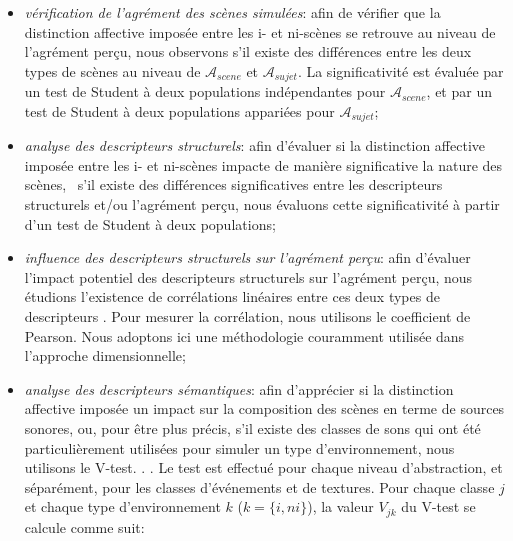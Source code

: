 \documentclass[twoside,twocolumn]{article}
\begin{document}
\begin{itemize}
\item \emph{vérification de l'agrément des scènes simulées}: afin de vérifier que la distinction affective imposée entre les i- et ni-scènes se retrouve au niveau de l'agrément perçu, nous observons s'il existe des différences entre les deux types de scènes au niveau de $\mathcal{A}_{scene}$ et $\mathcal{A}_{sujet}$. La significativité est évaluée par un test de Student à deux populations indépendantes pour $\mathcal{A}_{scene}$, et par un test de Student à deux populations appariées pour $\mathcal{A}_{sujet}$;
\item \emph{analyse des descripteurs structurels}: afin d'évaluer si la distinction affective imposée entre les i- et ni-scènes impacte de manière significative la nature des scènes, \ie~s'il existe des différences significatives entre les descripteurs structurels et/ou l'agrément perçu, nous évaluons cette significativité à partir d'un test de Student à deux populations;
\item \emph{influence des descripteurs structurels sur l'agrément perçu}: afin d'évaluer l'impact potentiel des descripteurs structurels sur l'agrément perçu, nous étudions l'existence de corrélations linéaires entre ces deux types de descripteurs . Pour mesurer la corrélation, nous utilisons le coefficient de Pearson. Nous adoptons ici une méthodologie couramment utilisée dans l'approche dimensionnelle;
\item \emph{analyse des descripteurs sémantiques}: afin d'apprécier si la distinction affective imposée   un impact sur la composition des scènes en terme de sources sonores, ou, pour être plus précis, s'il existe des classes de sons qui ont été particulièrement utilisées pour simuler un type d'environnement, nous utilisons le V-test.  . . Le test est effectué pour chaque niveau d'abstraction, et séparément, pour les classes d'événements et de textures. Pour chaque classe $j$ et chaque type d'environnement $k$ ($k=\lbrace i,ni\rbrace$), la valeur $V_{jk}$ du V-test se calcule comme suit: 


\end{itemize}
\end{document}
